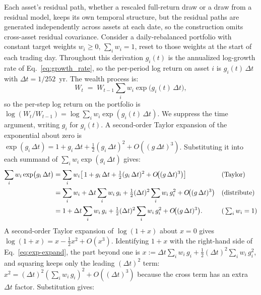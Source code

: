 Each asset's residual path,
whether a rescaled full-return draw or a draw from a residual model,
keeps its own temporal structure, but the residual paths are generated
independently across assets at each date, so the construction omits
cross-asset residual covariance. Consider a daily-rebalanced portfolio
with constant target weights $w_i \ge 0$, $\sum_i w_i = 1$,
reset to those weights at the start of each trading day. Throughout
this derivation $g_i(t)$ is the annualized log-growth rate of
Eq.~\eqref{eq:growth_rate}, so the per-period log return on asset
$i$ is $g_i(t)\,\Delta t$ with $\Delta t = 1/252$~yr. The wealth
process is:
\begin{equation}
  W_t \;=\; W_{t-1} \sum_{i} w_i \exp\!\big(g_i(t)\,\Delta t\big),
  \label{eq:wealth-recursion}
\end{equation}
so the per-step log return on the portfolio is
$\log(W_t/W_{t-1}) = \log\!\sum_i w_i \exp(g_i(t)\,\Delta t)$. We
suppress the time argument, writing $g_i$ for $g_i(t)$. A
second-order Taylor expansion of the exponential about zero is
$\exp(g_i\,\Delta t) = 1 + g_i\,\Delta t + \tfrac{1}{2}(g_i\,\Delta t)^2
+ O((g\,\Delta t)^3)$. Substituting it into each summand of
$\sum_i w_i \exp(g_i\,\Delta t)$ gives:
\begin{align}
  \sum_{i} w_i \exp\!\big(g_i\,\Delta t\big)
   &= \sum_{i} w_i \!\left[\,1 + g_i\,\Delta t
        + \tfrac{1}{2}(g_i\,\Delta t)^2
        + O\!\big((g\,\Delta t)^3\big)\right]
       && \text{(Taylor)} \notag \\
   &= \sum_{i} w_i
        + \Delta t \sum_{i} w_i\, g_i
        + \tfrac{1}{2}(\Delta t)^2 \sum_{i} w_i\, g_i^2
        + O\!\big((g\,\Delta t)^3\big)
       && \text{(distribute)} \notag \\
   &= 1 + \Delta t \sum_{i} w_i\, g_i
        + \tfrac{1}{2}(\Delta t)^2 \sum_{i} w_i\, g_i^2
        + O\!\big((g\,\Delta t)^3\big).
       && \text{(}\textstyle\sum_i w_i = 1\text{)}
  \label{eq:exp-expand}
\end{align}
A second-order Taylor expansion of $\log(1+x)$ about $x=0$ gives
$\log(1+x) = x - \tfrac{1}{2}x^2 + O(x^3)$. Identifying $1 + x$ with
the right-hand side of Eq.~\eqref{eq:exp-expand}, the part beyond one
is
$x :=\Delta t \sum_i w_i\, g_i + \tfrac{1}{2}(\Delta t)^2 \sum_i w_i\, g_i^2$,
and squaring keeps only the leading $(\Delta t)^2$ term:
$x^2 = (\Delta t)^2 (\sum_i w_i\, g_i)^2 + O((\Delta t)^3)$ because
the cross term has an extra $\Delta t$ factor. Substitution gives:
